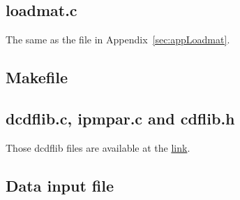 \documentclass{article}
\begin{document}
\subsection{loadmat.c}
The same as the file in Appendix~\ref{sec:appLoadmat}.
\subsection{Makefile}
\subsection{dcdflib.c, ipmpar.c and cdflib.h}
Those dcdflib files are available at the
\href{http://www.netlib.org/random/dcdflib.c.tar.gz}{link}.

\subsection{Data input file}\label{sec:dataANOVA}
\end{document}
